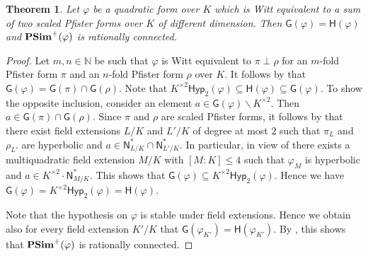 \documentclass[twoside,11pt]{amsart}
\numberwithin{equation}{section}
\newtheorem{thm}[equation]{Theorem}
\theoremstyle{definition}
\newcommand\N{\operatorname{N}}
\newcommand{\vf}{\varphi}
\newcommand{\sq}[1]{{#1}^{\times 2}}
\newcommand{\nat}{\mathbb{N}}
\renewcommand{\leq}{\leqslant}
\renewcommand{\N}{\mathsf{N}}
\newcommand{\G}{\mathsf{G}}
\renewcommand{\H}{\mathsf{H}}
\newcommand{\Hyp}{\mathsf{Hyp}}
\renewcommand{\setminus}{\smallsetminus}
\renewcommand{\leq}{\leqslant}
\renewcommand{\setminus}{\smallsetminus}
\begin{document}
\begin{thm}\label{2Pfister-ratcon}
Let $\vf$ be a quadratic form over $K$ which is Witt equivalent to a sum of two scaled Pfister forms over $K$ of different dimension.
Then $\G(\vf)=\H(\vf)$ and ${\bf PSim}^+(\varphi)$ is rationally connected.
\end{thm}
\begin{proof}
Let $m,n\in\nat$ be such that $\vf$ is Witt equivalent to $\pi\perp\rho$ for an $m$-fold Pfister form $\pi$ and an $n$-fold Pfister form $\rho$ over $K$.
It follows by  that $\G(\vf)=\G(\pi)\cap\G(\rho)$.
Note that $ \sq{K}\Hyp_2(\vf)\subseteq\H(\vf)\subseteq \G(\vf)$. To show the opposite inclusion,
consider an element $a\in\G(\vf)\setminus\sq{K}$. 
Then $a\in\G(\pi)\cap\G(\rho)$.
Since $\pi$ and $\rho$ are scaled Pfister forms, it follows by  that there exist field extensions $L/K$ and $L'/K$
of degree at most $2$ such that $\pi_L$ and $\rho_{L'}$ are hyperbolic and $a\in\N_{L/K}^\ast\cap\N_{L'/K}^\ast$.
In particular, in view of   there exists a multiquadratic field extension $M/K$ with $[M:K]\leq 4$ such that $\vf_M$ is hyperbolic and $a\in\sq{K}\cdot\N^\ast_{M/K}$.
This  shows that $\G(\varphi)\subseteq\sq{K}\Hyp_2(\vf)$.
Hence we have $\G(\vf)=\sq{K}\Hyp_2(\vf)=\H(\vf)$.

Note that the hypothesis on $\vf$ is stable under field extensions. Hence we obtain also for every field extension $K'/K$ that $\G(\varphi_{K'})=\H(\varphi_{K'})$.
By , this shows that ${\bf PSim}^+(\vf)$ is rationally connected.
\end{proof}
\end{document}

